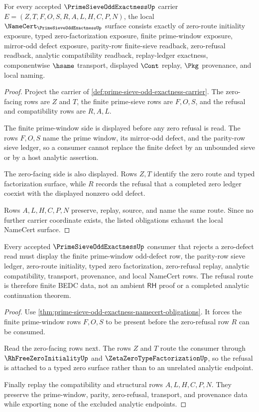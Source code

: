 \begin{theorem}
\label{thm:prime-sieve-odd-exactness-namecert-obligations}
For every accepted $\PrimeSieveOddExactnessUp$ carrier $E=(Z,T,F,O,S,R,A,L,H,C,P,N)$, the local $\NameCert_{\PrimeSieveOddExactnessUp}$ surface consists exactly of zero-route initiality exposure, typed zero-factorization exposure, finite prime-window exposure, mirror-odd defect exposure, parity-row finite-sieve readback, zero-refusal readback, analytic compatibility readback, replay-ledger exactness, componentwise $\hsame$ transport, displayed $\Cont$ replay, $\Pkg$ provenance, and local naming.
\end{theorem}
\begin{proof}
Project the carrier of \autoref{def:prime-sieve-odd-exactness-carrier}. The zero-facing rows are $Z$ and $T$, the finite prime-sieve rows are $F,O,S$, and the refusal and compatibility rows are $R,A,L$.

The finite prime-window side is displayed before any zero refusal is read. The rows $F,O,S$ name the prime window, its mirror-odd defect, and the parity-row sieve ledger, so a consumer cannot replace the finite defect by an unbounded sieve or by a host analytic assertion.

The zero-facing side is also displayed. Rows $Z,T$ identify the zero route and typed factorization surface, while $R$ records the refusal that a completed zero ledger coexist with the displayed nonzero odd defect.

Rows $A,L,H,C,P,N$ preserve, replay, source, and name the same route. Since no further carrier coordinate exists, the listed obligations exhaust the local NameCert surface.
\end{proof}

\begin{theorem}
\label{thm:prime-sieve-odd-exactness-defect-refusal-route}
Every accepted $\PrimeSieveOddExactnessUp$ consumer that rejects a zero-defect read must display the finite prime-window odd-defect row, the parity-row sieve ledger, zero-route initiality, typed zero factorization, zero-refusal replay, analytic compatibility, transport, provenance, and local NameCert rows. The refusal route is therefore finite BEDC data, not an ambient $\mathsf{RH}$ proof or a completed analytic continuation theorem.
\end{theorem}
\begin{proof}
Use \autoref{thm:prime-sieve-odd-exactness-namecert-obligations}. It forces the finite prime-window rows $F,O,S$ to be present before the zero-refusal row $R$ can be consumed.

Read the zero-facing rows next. The rows $Z$ and $T$ route the consumer through $\RhFreeZeroInitialityUp$ and $\ZetaZeroTypeFactorizationUp$, so the refusal is attached to a typed zero surface rather than to an unrelated analytic endpoint.

Finally replay the compatibility and structural rows $A,L,H,C,P,N$. They preserve the prime-window, parity, zero-refusal, transport, and provenance data while exporting none of the excluded analytic endpoints.
\end{proof}

